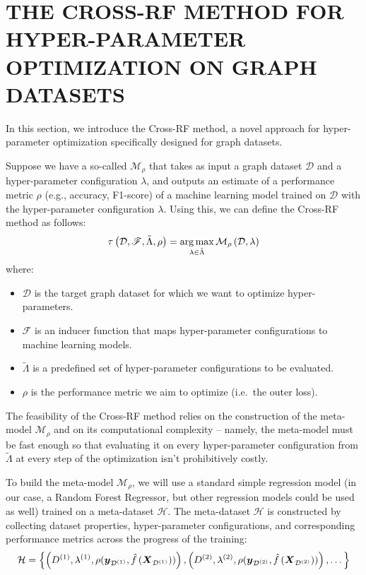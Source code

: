\section{\uppercase{The Cross-RF Method for Hyper-Parameter Optimization on Graph Datasets}}

In this section, we introduce the Cross-RF method, a novel approach for hyper-parameter optimization specifically designed for graph datasets.

Suppose we have a so-called  \( \mathcal{M}_\rho \) that takes as input a graph dataset \( \mathcal{D} \) and a hyper-parameter configuration \( \lambda \), and outputs an estimate of a performance metric \( \rho \) (e.g., accuracy, F1-score) of a machine learning model trained on \( \mathcal{D} \) with the hyper-parameter configuration \( \lambda \). Using this, we can define the Cross-RF method as follows:
\[ \tau \left( \mathcal{D}, \mathscr{F}, \tilde{\Lambda}, \rho \right) = \operatorname*{arg\,max}_{\lambda \in \tilde{\Lambda}} \mathcal{M}_\rho \left( \mathcal{D}, \lambda \right) \]
where:
\begin{itemize}
	\item \( \mathcal{D} \) is the target graph dataset for which we want to optimize hyper-parameters.
	\item \( \mathscr{F} \) is an inducer function that maps hyper-parameter configurations to machine learning models.
	\item \( \tilde{\Lambda} \) is a predefined set of hyper-parameter configurations to be evaluated.
	\item \( \rho \) is the performance metric we aim to optimize (i.e.\ the outer loss).
\end{itemize}
The feasibility of the Cross-RF method relies on the construction of the meta-model \( \mathcal{M}_\rho \) and on its computational complexity -- namely, the meta-model must be fast enough so that evaluating it on every hyper-parameter configuration from \( \tilde{\Lambda} \) at every step of the optimization isn't prohibitively costly.

To build the meta-model \( \mathcal{M}_\rho \), we will use a standard simple regression model (in our case, a Random Forest Regressor, but other regression models could be used as well) trained on a meta-dataset \( \mathcal{H} \).
The meta-dataset \( \mathcal{H} \) is constructed by collecting dataset properties, hyper-parameter configurations, and corresponding performance metrics across the progress of the training:
\[ \mathcal{H} = \left\{ \left( D^{(1)}, \lambda^{(1)}, \rho( \boldsymbol{y}_{\mathcal{D}^{(1)}}, \hat{f} \left( \boldsymbol{X}_{\mathcal{D}^{(1)}} \right) ) \right), \left( D^{(2)}, \lambda^{(2)}, \rho( \boldsymbol{y}_{\mathcal{D}^{(2)}}, \hat{f} \left( \boldsymbol{X}_{\mathcal{D}^{(2)}} \right) ) \right), \dots \right\} \]
